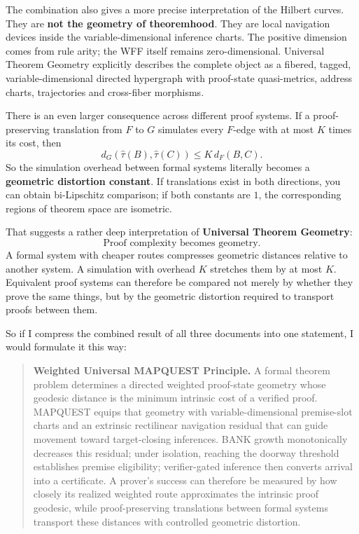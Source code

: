 \documentclass[11pt]{article}
\theoremstyle{definition}
\theoremstyle{remark}
\begin{document}
The combination also gives a more precise interpretation of the Hilbert curves. They are \textbf{not the geometry of theoremhood}. They are local navigation devices inside the variable-dimensional inference charts. The positive dimension comes from rule arity; the WFF itself remains zero-dimensional. Universal Theorem Geometry explicitly describes the complete object as a fibered, tagged, variable-dimensional directed hypergraph with proof-state quasi-metrics, address charts, trajectories and cross-fiber morphisms.

There is an even larger consequence across different proof systems. If a proof-preserving translation from $F$ to $G$ simulates every $F$-edge with at most $K$ times its cost, then
\[
d_G(\widehat\tau(B),\widehat\tau(C))\le K\,d_F(B,C).
\]
So the simulation overhead between formal systems literally becomes a \textbf{geometric distortion constant}. If translations exist in both directions, you can obtain bi-Lipschitz comparison; if both constants are $1$, the corresponding regions of theorem space are isometric.

That suggests a rather deep interpretation of \textbf{Universal Theorem Geometry}:
\[
\boxed{\text{Proof complexity becomes geometry.}}
\]
A formal system with cheaper routes compresses geometric distances relative to another system. A simulation with overhead $K$ stretches them by at most $K$. Equivalent proof systems can therefore be compared not merely by whether they prove the same things, but by the geometric distortion required to transport proofs between them.

So if I compress the combined result of all three documents into one statement, I would formulate it this way:

\begin{quote}
\textbf{Weighted Universal MAPQUEST Principle.} A formal theorem problem determines a directed weighted proof-state geometry whose geodesic distance is the minimum intrinsic cost of a verified proof. MAPQUEST equips that geometry with variable-dimensional premise-slot charts and an extrinsic rectilinear navigation residual that can guide movement toward target-closing inferences. BANK growth monotonically decreases this residual; under isolation, reaching the doorway threshold establishes premise eligibility; verifier-gated inference then converts arrival into a certificate. A prover's success can therefore be measured by how closely its realized weighted route approximates the intrinsic proof geodesic, while proof-preserving translations between formal systems transport these distances with controlled geometric distortion.
\end{quote}
\end{document}
